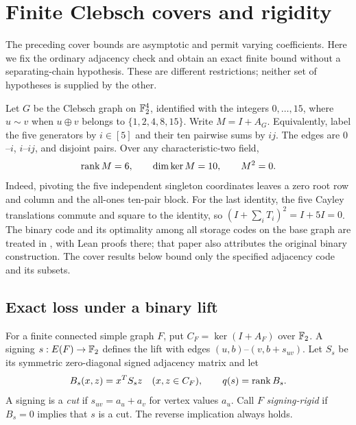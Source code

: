 \section{Finite Clebsch covers and rigidity}\label{sec:clebsch-finite}

The preceding cover bounds are asymptotic and permit varying coefficients.
Here we fix the ordinary adjacency check and obtain an exact finite bound
without a separating-chain hypothesis. These are different restrictions;
neither set of hypotheses is supplied by the other.

Let $G$ be the Clebsch graph on $\mathbb{F}_2^4$, identified with the integers
$0,\ldots,15$, where $u\sim v$ when $u\mathbin\oplus v$ belongs to
$\{1,2,4,8,15\}$. Write $M=I+A_G$.
Equivalently, label the five generators by $i\in[5]$ and their ten
pairwise sums by $ij$. The edges are $0$--$i$, $i$--$ij$, and disjoint
pairs. Over any characteristic-two field,
\begin{equation}\label{eq:clebsch-base}
 \operatorname{rank} M=6,\qquad \dim\ker M=10,\qquad M^2=0.
\end{equation}
Indeed, pivoting the five independent singleton coordinates leaves a zero
root row and column and the all-ones ten-pair block. For the last identity,
the five Cayley translations commute and square to the identity, so
$(I+\sum_iT_i)^2=I+5I=0$. The binary code and its optimality among all
storage codes on the base graph are treated in
\cite[Corollary H4]{BrendeCurved}, with Lean proofs there; that paper also
attributes the original binary construction. The cover results below
bound only the specified adjacency code and its subsets.

\subsection{Exact loss under a binary lift}
For a finite connected simple graph $F$, put $C_F=\ker(I+A_F)$ over
$\mathbb{F}_2$. A signing $s:E(F)\to\mathbb{F}_2$ defines the lift with edges
$(u,b)$--$(v,b+s_{uv})$. Let $S_s$ be its symmetric zero-diagonal
signed adjacency matrix and let
\[
 B_s(x,z)=x^TS_sz\quad(x,z\in C_F),\qquad q(s)=\operatorname{rank} B_s.
\]
A signing is a \emph{cut} if $s_{uv}=a_u+a_v$ for vertex values $a_u$.
Call $F$ \emph{signing-rigid} if $B_s=0$ implies that $s$ is a cut.
The reverse implication always holds.

